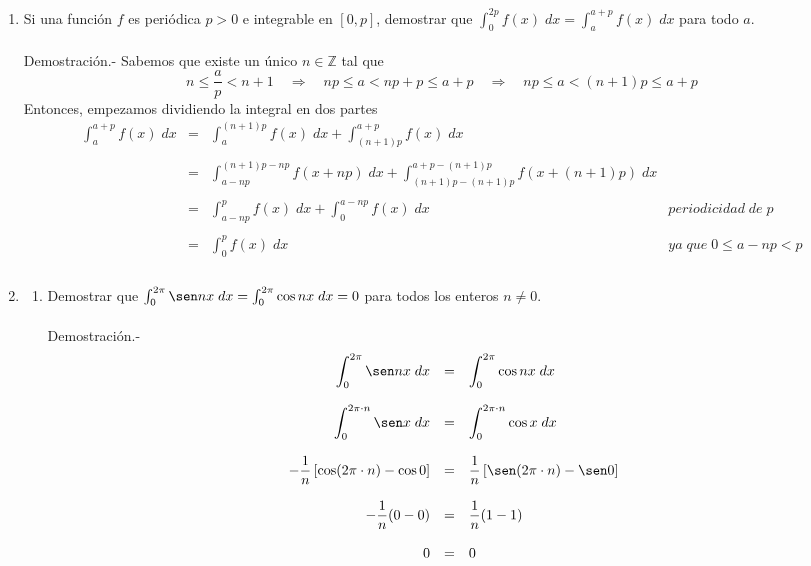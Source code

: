 \begin{enumerate}[\bfseries 1.]
\item Si una función $f$ es periódica $p>0$ e integrable en $[0,p]$, demostrar que $\int_{0}^{2p} f(x)\; dx = \int_a^{a+p} f(x)\; dx$ para todo $a$.\\\\
    Demostración.-\; Sabemos que existe un único $n\in \mathbb{Z}$ tal que 
    $$n\leq \dfrac{a}{p}<n+1 \quad \Longrightarrow \quad np\leq a < np + p \leq a + p \quad \Longrightarrow \quad np\leq a < (n+1)p\leq a+p$$
    Entonces, empezamos dividiendo la integral en dos partes\\ 
    $$\begin{array}{rcll}
	\displaystyle\int_{a}^{a+p}f(x) \; dx&=&\displaystyle\int_{a}^{(n+1)p}f(x) \; dx + \displaystyle\int_{(n+1)p}^{a+p}f(x) \; dx &\\\\
					     &=&\displaystyle\int_{a-np}^{(n+1)p-np} f(x+np) \; dx + \displaystyle\int_{(n+1)p-(n+1)p}^{a+p-(n+1)p} f(x+(n+1)p)  \; dx &\\\\
					     &=&\displaystyle\int_{a-np}^{p} f(x) \; dx + \displaystyle\int_{0}^{a-np} f(x) \; dx & periodicidad \; de \; p\\\\
					     &=&\displaystyle\int_{0}^{p} f(x) \; dx & ya \; que\;  0\leq a-np<p\\\\
    \end{array}$$

\item
\begin{enumerate}[\bfseries (a)]

    \item Demostrar que $\int_0^{2\pi} \sen nx \;dx = \int_0^{2\pi} \cos nx \; dx = 0$ para todos los enteros $n\neq 0$.\\\\
	Demostración.-\; 
	$$\begin{array}{rcl}
	    \displaystyle\int_0^{2\pi} \sen nx\; dx&=&\displaystyle\int_0^{2\pi}\cos nx\; dx\\\\
	    \displaystyle\int_0^{2\pi\cdot n}\sen x \; dx&=&\displaystyle\int_0^{2\pi\cdot n}\cos x \; dx\\\\
	    -\dfrac{1}{n}\left[\cos(2\pi\cdot n)-\cos 0\right]&=&\dfrac{1}{n} \left[\sen(2\pi\cdot n) - \sen 0\right]\\\\
	    -\dfrac{1}{n}(0-0)&=&\dfrac{1}{n}(1-1)\\\\
	    0&=&0\\\\
	\end{array}$$


\end{enumerate}
\end{enumerate}

